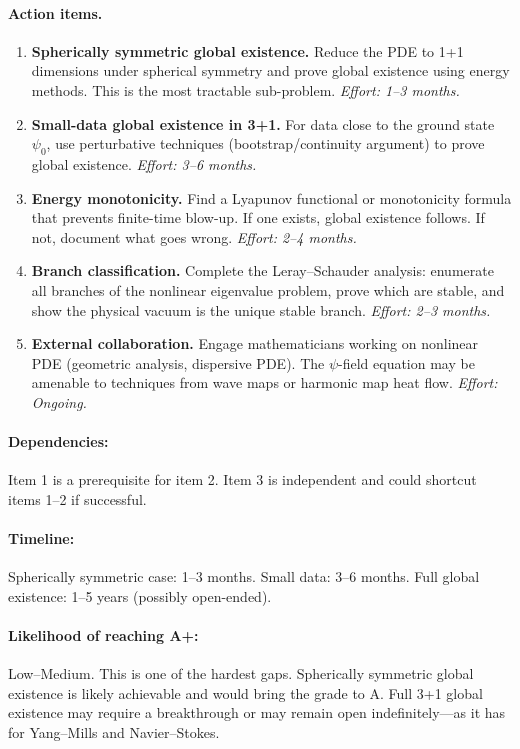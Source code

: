 \documentclass[11pt,a4paper]{article}
\begin{document}
\paragraph{Action items.}
\begin{enumerate}
    \item \textbf{Spherically symmetric global existence.} Reduce the PDE to 1+1 dimensions under spherical symmetry and prove global existence using energy methods. This is the most tractable sub-problem. \emph{Effort: 1--3 months.}
    \item \textbf{Small-data global existence in 3+1.} For data close to the ground state $\psi_0$, use perturbative techniques (bootstrap/continuity argument) to prove global existence. \emph{Effort: 3--6 months.}
    \item \textbf{Energy monotonicity.} Find a Lyapunov functional or monotonicity formula that prevents finite-time blow-up. If one exists, global existence follows. If not, document what goes wrong. \emph{Effort: 2--4 months.}
    \item \textbf{Branch classification.} Complete the Leray--Schauder analysis: enumerate all branches of the nonlinear eigenvalue problem, prove which are stable, and show the physical vacuum is the unique stable branch. \emph{Effort: 2--3 months.}
    \item \textbf{External collaboration.} Engage mathematicians working on nonlinear PDE (geometric analysis, dispersive PDE). The $\psi$-field equation may be amenable to techniques from wave maps or harmonic map heat flow. \emph{Effort: Ongoing.}
\end{enumerate}

\paragraph{Dependencies:} Item 1 is a prerequisite for item 2. Item 3 is independent and could shortcut items 1--2 if successful.

\paragraph{Timeline:} Spherically symmetric case: 1--3 months. Small data: 3--6 months. Full global existence: 1--5 years (possibly open-ended).

\paragraph{Likelihood of reaching A+:} \textcolor{hardproblem}{Low--Medium}. This is one of the hardest gaps. Spherically symmetric global existence is likely achievable and would bring the grade to A. Full 3+1 global existence may require a breakthrough or may remain open indefinitely---as it has for Yang--Mills and Navier--Stokes.
\end{document}
